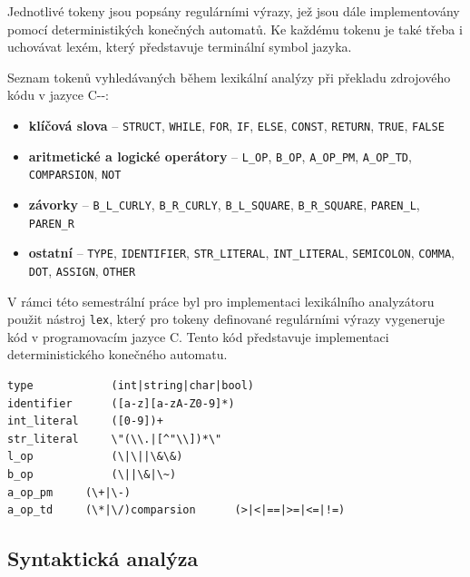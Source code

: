 \documentclass[12pt, a4paper]{article}
\begin{document}
Jednotlivé tokeny jsou popsány regulárními výrazy, jež jsou dále implementovány pomocí deterministikých konečných automatů. Ke každému tokenu je také třeba i uchovávat lexém, který představuje terminální symbol jazyka.

\newpage
Seznam tokenů vyhledávaných během lexikální analýzy při překladu zdrojového kódu v jazyce C-{}-:

\begin{itemize}
    \item \textbf{klíčová slova} -- \texttt{STRUCT}, \texttt{WHILE}, \texttt{FOR}, \texttt{IF}, \texttt{ELSE}, \texttt{CONST}, \texttt{RETURN}, \texttt{TRUE}, \texttt{FALSE}

    \item \textbf{aritmetické a logické operátory} -- \texttt{L\_OP}, \texttt{B\_OP}, \texttt{A\_OP\_PM}, \texttt{A\_OP\_TD}, \texttt{COMPARSION}, \texttt{NOT}
    \item \textbf{závorky} -- \texttt{B\_L\_CURLY}, \texttt{B\_R\_CURLY}, \texttt{B\_L\_SQUARE}, \texttt{B\_R\_SQUARE}, \texttt{PAREN\_L}, \texttt{PAREN\_R}
    \item \textbf{ostatní} -- \texttt{TYPE}, \texttt{IDENTIFIER}, \texttt{STR\_LITERAL}, \texttt{INT\_LITERAL}, \texttt{SEMICOLON}, \texttt{COMMA}, \texttt{DOT}, \texttt{ASSIGN}, \texttt{OTHER}


\end{itemize}

V rámci této semestrální práce byl pro implementaci lexikálního analyzátoru použit nástroj \texttt{lex}, který pro tokeny definované regulárními výrazy vygeneruje kód v programovacím jazyce C. Tento kód představuje implementaci deterministického konečného automatu.

\begin{lstlisting}[caption={Ukázka regulárních výrazů pro skenování tokenů}, captionpos=b, style=flex]
type            (int|string|char|bool)
identifier      ([a-z][a-zA-Z0-9]*)
int_literal     ([0-9])+
str_literal     \"(\\.|[^"\\])*\"
l_op            (\|\||\&\&)
b_op            (\||\&|\~)
a_op_pm     (\+|\-)
a_op_td     (\*|\/)comparsion      (>|<|==|>=|<=|!=)
\end{lstlisting}

\subsection{Syntaktická analýza}
\end{document}
